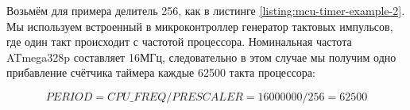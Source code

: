 \documentclass[../sparc.tex]{subfiles}
\begin{document}
Возьмём для примера делитель 256, как в листинге
\ref{listing:mcu-timer-example-2}.  Мы используем встроенный в микроконтроллер
генератор тактовых импульсов, где один такт происходит с частотой процессора.
Номинальная частота ATmega328p составляет 16МГц, следовательно в этом случае мы
получим одно прибавление счётчика таймера каждые 62500 такта процессора:

\begin{equation}
  PERIOD = CPU\_FREQ / PRESCALER = 16000000 / 256 = 62500
\end{equation}
\end{document}
